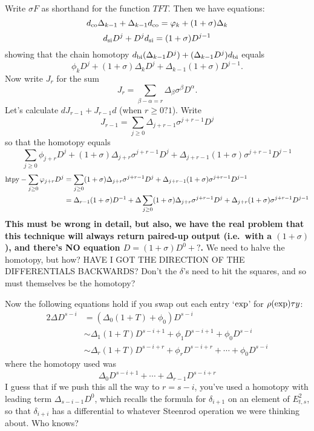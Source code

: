 \documentclass[10pt]{article}
\newcommand{\twist}{\sigma}
\begin{document}
\begin{Adams sseq operations}
Write $\twist F$ as shorthand for the function $TFT$. Then we have equations:
\[d_\textup{co}\Delta_{k-1}+\Delta_{k-1}d_\textup{co}= \phi_{k}+(1+\twist)\Delta_{k}\]
\[d_\textup{si}D^{j}+D^{j}d_\textup{si}=(1+\twist)D^{j-1}\]
showing that the chain homotopy $d_\textup{bi}(\Delta_{k-1}D^{j})+(\Delta_{k-1}D^{j}) d_\textup{bi}$ equals
\[\phi_{k}D^{j}+(1+\twist)\Delta_{k}D^{j}+\Delta_{k-1}(1+\twist)D^{j-1}.\]
Now write $J_r$ for the sum
\[J_r=\sum_{\beta-\alpha=r}\Delta_\beta\twist^\beta D^\alpha.\]
Let's calculate $dJ_{r-1}+J_{r-1}d$ (when $r\geq0\textbf{?}1$). Write
\[J_{r-1}=\sum_{j\geq0}\Delta_{j+r-1}\twist^{j+r-1}D^{j}\]
so that the homotopy equals
\[\sum_{j\geq0}\phi_{j+r}D^{j}+ (1+\twist)\Delta_{j+r}\twist^{j+r-1}D^{j}+\Delta_{j+r-1}(1+\twist)\twist^{j+r-1}D^{j-1}\]
\begin{alignat*}{2}
\textup{htpy}-\sum_{j\geq0}\phi_{j+r}D^{j}
&=
\sum_{j\geq0}(1+\twist)\Delta_{j+r}\twist^{j+r-1}D^{j}+\Delta_{j+r-1}(1+\twist)\twist^{j+r-1}D^{j-1}%
\\
&=
\Delta_{r-1}(1+\twist)D^{-1}+\Delta\sum_{j\geq0}(1+\twist)\Delta_{j+r}\twist^{j+r-1}D^{j}+\Delta_{j+r}(1+\twist)\twist^{j+r-1}D^{j-1}%
\end{alignat*}
\textbf{This must be wrong in detail, but also, we have the real problem that this technique will always return paired-up output (i.e.\ with a $(1+\twist)$), and there's NO equation $D=(1+\twist)D^0+?$.} We need to halve the homotopy, but how? HAVE I GOT THE DIRECTION OF THE DIFFERENTIALS BACKWARDS? Don't the $\delta$'s need to hit the squares, and so must themselves be the homotopy?

Now the following equations hold if you swap out each entry `$\textup{exp}$' for $\rho(\textup{exp})\tau y$:
\begin{alignat*}{2}
\Delta D^{s-i}
&=
(\Delta_0(1+T)+\phi_0)D^{s-i}%
\\
&\sim
\Delta_1(1+T)D^{s-i+1}+\phi_1D^{s-i+1}+\phi_0D^{s-i}%
\\
&\sim
\Delta_r(1+T)D^{s-i+r}+\phi_rD^{s-i+r}+\cdots+\phi_0D^{s-i}%
\end{alignat*}
where the homotopy used was
\[\Delta_0D^{s-i+1}+\cdots +\Delta_{r-1}D^{s-i+r}\]
I guess that if we push this all the way to $r=s-i$, you've used a homotopy with leading term $\Delta_{s-i-1}D^0$, which recalls the formula for $\delta_{i+1}$ on an element of $E^2_{t,s}$, so that $\delta_{i+i}$ has a differential to whatever Steenrod operation we were thinking about. Who knows?


\end{Adams sseq operations}
\end{document}
